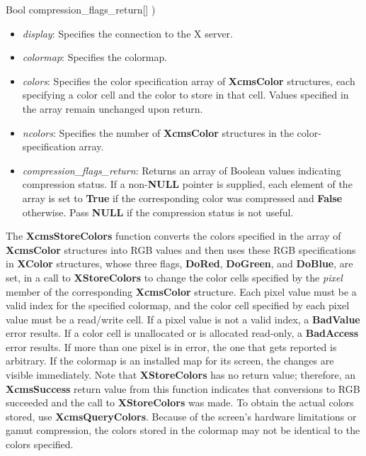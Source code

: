 \documentclass{report}
\begin{document}
\begin{itemize}
\begin{cppcode}
                    Bool compression_flags_return[]
                )
            \end{cppcode}
            \begin{itemize}
                \item \textit{display}: Specifies the connection to the X server.
                \item \textit{colormap}: Specifies the colormap.
                \item \textit{colors}: Specifies the color specification array of \textbf{XcmsColor} structures, each specifying a color cell and the color to store in that cell. Values specified in the array remain unchanged upon return.
                \item \textit{ncolors}: Specifies the number of \textbf{XcmsColor} structures in the color-specification array.
                \item \textit{compression\_flags\_return}: Returns an array of Boolean values indicating compression status. If a non-\textbf{NULL} pointer is supplied, each element of the array is set to \textbf{True} if the corresponding color was compressed and \textbf{False} otherwise. Pass \textbf{NULL} if the compression status is not useful.
            \end{itemize}
            \noindent
            The \textbf{XcmsStoreColors} function converts the colors specified in the array of \textbf{XcmsColor} structures into RGB values and then uses these RGB specifications in \textbf{XColor} structures, whose three flags, \textbf{DoRed}, \textbf{DoGreen}, and \textbf{DoBlue}, are set, in a call to \textbf{XStoreColors} to change the color cells specified by the \textit{pixel} member of the corresponding \textbf{XcmsColor} structure.
            \bigbreak \noindent
            Each pixel value must be a valid index for the specified colormap, and the color cell specified by each pixel value must be a read/write cell. If a pixel value is not a valid index, a \textbf{BadValue} error results. If a color cell is unallocated or is allocated read-only, a \textbf{BadAccess} error results. If more than one pixel is in error, the one that gets reported is arbitrary. If the colormap is an installed map for its screen, the changes are visible immediately.
            \bigbreak \noindent
            Note that \textbf{XStoreColors} has no return value; therefore, an \textbf{XcmsSuccess} return value from this function indicates that conversions to RGB succeeded and the call to \textbf{XStoreColors} was made. To obtain the actual colors stored, use \textbf{XcmsQueryColors}. Because of the screen's hardware limitations or gamut compression, the colors stored in the colormap may not be identical to the colors specified.

\end{itemize}
\end{document}

